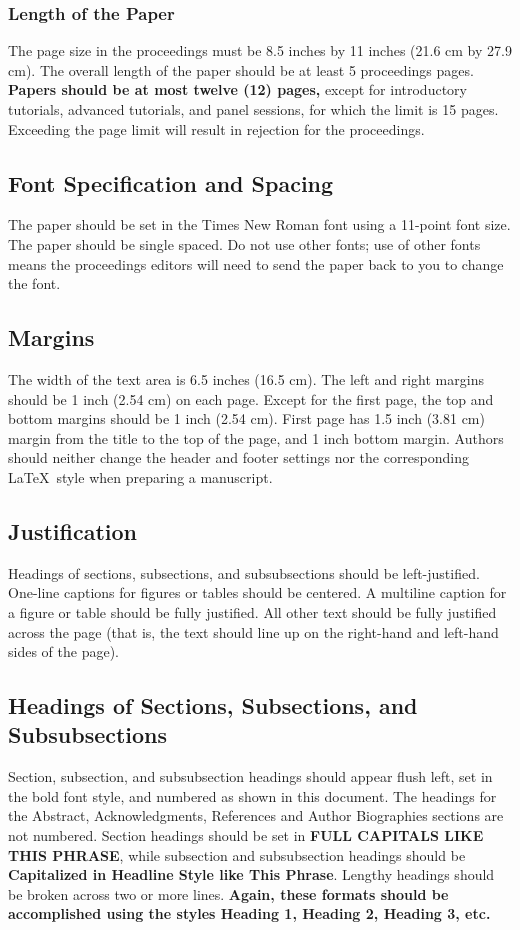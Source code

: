 \documentclass{wscpaperproc}
\theoremstyle{wsc}
\begin{document}
\subsubsection{Length of the Paper}
The page size in the proceedings must be 8.5 inches by 11 inches (21.6 cm by 27.9 cm). The overall length of the paper should be at least 5 proceedings pages. \textbf{Papers should be at most twelve (12) pages,} except for introductory tutorials, advanced tutorials, and panel sessions, for which the limit is 15 pages. Exceeding the page limit will result in rejection for the proceedings.

\subsection{Font Specification and Spacing}
The paper should be set in the Times New Roman font using a 11-point font size. The paper should be single spaced. Do not use other fonts; use of other fonts means the proceedings editors will need to send the paper back to you to change the font.

\subsection{Margins}
\label{sec:margins}
The width of the text area is 6.5 inches (16.5 cm). The left and right margins should be 1 inch (2.54 cm) on each page. Except for the first page, the top and bottom margins should be 1 inch (2.54 cm). First page has 1.5 inch (3.81 cm) margin from the title to the top of the page, and 1 inch bottom margin. Authors should neither change the header and footer settings nor the corresponding \LaTeX\ style when preparing a manuscript.

\subsection{Justification}
Headings of sections, subsections, and subsubsections should be left-justified. One-line captions for figures or tables should be centered. A multiline caption for a figure or table should be fully justified. All other text should be fully justified across the page (that is, the text should line up on the right-hand and left-hand sides of the page).

\subsection{Headings of Sections, Subsections, and Subsubsections}
Section, subsection, and subsubsection headings should appear flush left, set in the bold font style, and numbered as shown in this document. The headings for the Abstract, Acknowledgments, References and Author Biographies sections are not numbered. Section headings should be set in \textbf{FULL CAPITALS LIKE THIS PHRASE}, while subsection and subsubsection headings should be \textbf{Capitalized in Headline Style like This Phrase}. Lengthy headings should be broken across two or more lines. \textbf{Again, these formats should be accomplished using the styles Heading 1, Heading 2, Heading 3, etc.}
\end{document}
